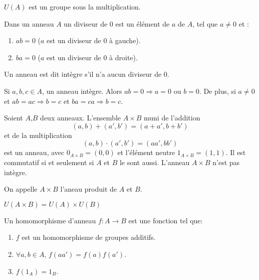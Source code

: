 \documentclass[12pt,a4paper]{article}
\begin{document}
\begin{flushleft}
\begin{prop}
$U(A)$ est un groupe sous la multiplication.
\end{prop}

\begin{mydef}
Dans un anneau $A$ un diviseur de $0$ est un élément de $a$ de $A$, tel que $a \neq 0$ et :
\begin{enumerate}
\item $ab = 0$ ($a$ est un diviseur de $0$ à gauche).
\item $ba = 0$ ($a$ est un diviseur de $0$ à droite).
\end{enumerate}
\end{mydef}

\begin{mydef}
Un anneau est dit intègre s'il n'a aucun diviseur de $0$.
\end{mydef}

\begin{prop}
Si $a,b,c \in A$, un anneau intègre. Alors $ab = 0 \Rightarrow a=0$ ou $b=0$. De plus, si $a \neq 0$ et $ab = ac \Rightarrow b=c$ et $ba = ca \Rightarrow b = c.$
\end{prop}

\begin{prop}
Soient $A$,$B$ deux anneaux. L'ensemble $A \times B$ muni de l'addition $$ (a,b) + (a',b') = (a+a',b+b')$$ et de la multiplication $$(a,b) \cdot (a',b') = (aa',bb')$$ est un anneau, avec $0_{A \times B} = (0,0)$ et l'élément neutre $1_{A \times B} = (1,1)$. Il est commutatif si et seulement si $A$ et $B$ le sont aussi. L'anneau $A \times B$ n'est pas intègre.
\end{prop}

\begin{mydef}
On appelle $A \times B$ l'aneau produit de $A$ et $B$.
\end{mydef}

\begin{prop} 
$U(A \times B) = U(A) \times U(B) $
\end{prop}

\begin{mydef}
Un homomorphisme d'anneau $f:A\longrightarrow B$ est une fonction tel que:
\begin{enumerate}
\item $f$ est un homomorphisme de groupes additifs.
\item $\forall a,b \in A$, $f(aa')=f(a)f(a')$.
\item $f(1_A) = 1_B$.
\end{enumerate}
\end{mydef}


\end{flushleft}
\end{document}
